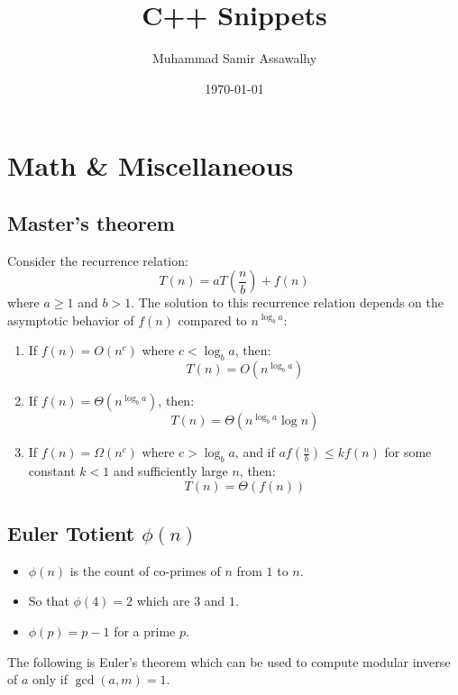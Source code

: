 \documentclass[14pt]{extarticle}
\title{\vspace{-4ex}\Large{C++ Snippets}}
\author{Muhammad Samir Assawalhy}
\date{\today}
\begin{document}
\maketitle
\vspace{-13ex}

\tableofcontents

\pagestyle{fancy}

% 

\section{Math & Miscellaneous}

\subsection{Master's theorem}

Consider the recurrence relation:
\[
T(n) = a T\left(\frac{n}{b}\right) + f(n)
\]
where \( a \geq 1 \) and \( b > 1 \). The solution to this recurrence relation depends on the asymptotic behavior of \( f(n) \) compared to \( n^{\log_b a} \):

\begin{enumerate}
    \item If \( f(n) = O(n^c) \) where \( c < \log_b a \), then:
    \[
    T(n) = O(n^{\log_b a})
    \]
    \item If \( f(n) = \Theta(n^{\log_b a}) \), then:
    \[
    T(n) = \Theta(n^{\log_b a} \log n)
    \]
    \item If \( f(n) = \Omega(n^c) \) where \( c > \log_b a \), and if \( a f\left(\frac{n}{b}\right) \leq k f(n) \) for some constant \( k < 1 \) and sufficiently large \( n \), then:
    \[
    T(n) = \Theta(f(n))
    \]
\end{enumerate}

\subsection{Euler Totient $\phi(n)$}

\begin{itemize}
  \item $\phi(n)$ is the count of co-primes of $n$ from $1$ to $n$.
  \item So that $\phi(4) = 2$ which are $3$ and $1$.
  \item $\phi(p) = p - 1$ for a prime $p$.
\end{itemize}

The following is Euler's theorem which can be used to compute modular inverse of $a$ only if $\gcd(a, m) = 1$.
\end{document}
